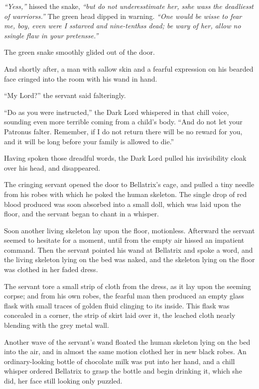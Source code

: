 \emph{``Yess,''} hissed the snake, \emph{``but do not underesstimate
her, sshe wass the deadliesst of warriorss.''} The green head dipped in
warning. \emph{``One would be wisse to fear me, boy, even were I
sstarved and nine-tenthss dead; be wary of her, allow no ssingle flaw in
your pretensse.''}

The green snake smoothly glided out of the door.

And shortly after, a man with sallow skin and a fearful expression on
his bearded face cringed into the room with his wand in hand.

``My Lord?'' the servant said falteringly.

``Do as you were instructed,'' the Dark Lord whispered in that chill
voice, sounding even more terrible coming from a child's body. ``And do
not let your Patronus falter. Remember, if I do not return there will be
no reward for you, and it will be long before your family is allowed to
die.''

Having spoken those dreadful words, the Dark Lord pulled his
invisibility cloak over his head, and disappeared.

The cringing servant opened the door to Bellatrix's cage, and pulled a
tiny needle from his robes with which he poked the human skeleton. The
single drop of red blood produced was soon absorbed into a small doll,
which was laid upon the floor, and the servant began to chant in a
whisper.

Soon another living skeleton lay upon the floor, motionless. Afterward
the servant seemed to hesitate for a moment, until from the empty air
hissed an impatient command. Then the servant pointed his wand at
Bellatrix and spoke a word, and the living skeleton lying on the bed was
naked, and the skeleton lying on the floor was clothed in her faded
dress.

The servant tore a small strip of cloth from the dress, as it lay upon
the seeming corpse; and from his own robes, the fearful man then
produced an empty glass flask with small traces of golden fluid clinging
to its inside. This flask was concealed in a corner, the strip of skirt
laid over it, the leached cloth nearly blending with the grey metal
wall.

Another wave of the servant's wand floated the human skeleton lying on
the bed into the air, and in almost the same motion clothed her in new
black robes. An ordinary-looking bottle of chocolate milk was put into
her hand, and a chill whisper ordered Bellatrix to grasp the bottle and
begin drinking it, which she did, her face still looking only puzzled.

